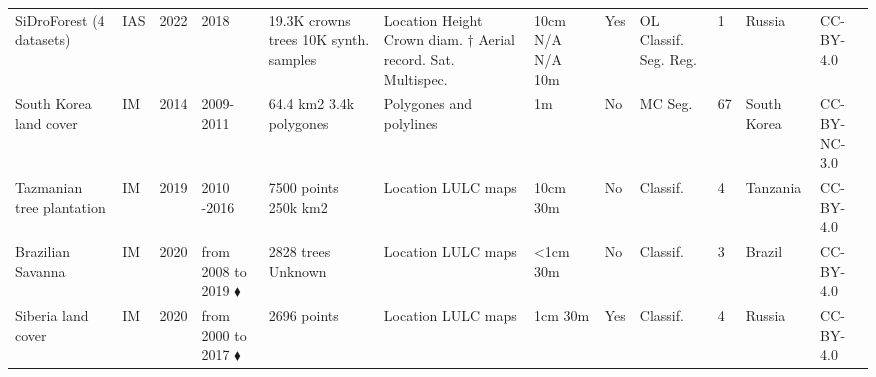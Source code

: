 \documentclass{CUP-JNL-DTM}%
\theoremstyle{definition}
\numberwithin{equation}{section}
\begin{document}
\begin{table*}[ht]
{\begin{fntable}
\begin{adjustwidth}{-0.8cm}{}
\begin{tabular}{p{1.4cm} | p{0.3cm} | p{0.4cm} | p{1cm} | p{1.4cm} | p{1.4cm} : p{1.5cm} | p{0.4cm} | p{0.7cm} | p{1cm} | p{1cm} | p{1.1cm}}
SiDroForest (4 datasets) \cite{brieger_advances_2019, van_geffen_sidroforest_2022} & IAS & 2022 & 2018 & 19.3K crowns  trees \newline 10K synth.  samples & Location \newline Height \newline Crown diam. \newline $\dagger$ Aerial record. \newline Sat. Multispec. & 10cm \newline N/A \newline N/A \newline 3cm \newline 10m & Yes & OL \newline Classif. \newline Seg. \newline Reg. & 1    & Russia & CC-BY-4.0 \\

South Korea land cover \cite{seo_deriving_2014} & IM & 2014 & 2009-2011 & 64.4 km2 \newline 3.4k polygones & Polygones and polylines & 1m & No & MC \newline Seg. & 67 & South Korea	& CC-BY-NC-3.0 \\ %

Tazmanian tree plantation \cite{koskinen_participatory_2019} & IM & 2019 & 2010 -2016 & 7500 points \newline 250k km2 & Location \newline LULC maps & 10cm \newline 30m & No & Classif. & 4 & Tanzania	 & CC-BY-4.0 \\

Brazilian Savanna \cite{bendini_combining_2020} & IM & 2020 & from 2008 to 2019 $\blacklozenge$ & 2828 trees \newline Unknown & Location \newline LULC maps & <1cm \newline 30m & No & Classif. & 3 & Brazil & CC-BY-4.0 \\

Siberia land cover \cite{shevtsova_strong_2020} & IM & 2020 & from 2000 to 2017 $\blacklozenge$ & 2696 points & Location \newline LULC maps & 1cm \newline 30m & Yes & Classif. & 4 & Russia & CC-BY-4.0 \\


\end{tabular}
\end{adjustwidth}
\end{fntable}}
\end{table*}
\end{document}
